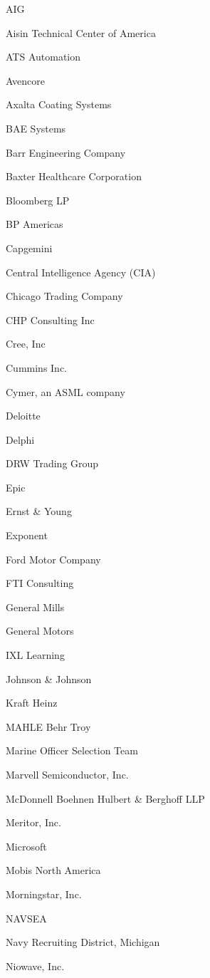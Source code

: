 \documentclass[twoside]{article}
\begin{document}
\begin{center}
\begin{multicols}{5}
\begin{FlushLeft}
\begin{compactitem}
        \item AIG
\item Aisin Technical Center of America
\item ATS Automation
\item Avencore
\item Axalta Coating Systems
\item BAE Systems
\item Barr Engineering Company
\item Baxter Healthcare Corporation
\item Bloomberg LP
\item BP Americas
\item Capgemini
\item Central Intelligence Agency (CIA)
\item Chicago Trading Company
\item CHP Consulting Inc
\item Cree, Inc
\item Cummins Inc.
\item Cymer, an ASML company
\item Deloitte
\item Delphi
\item DRW Trading Group
\item Epic
\item Ernst \& Young
\item Exponent
\item Ford Motor Company
\item FTI Consulting
\item General Mills
\item General Motors
\item IXL Learning
\item Johnson \& Johnson
\item Kraft Heinz
\item MAHLE Behr Troy
\item Marine Officer Selection Team
\item Marvell Semiconductor, Inc.
\item McDonnell Boehnen Hulbert \& Berghoff LLP
\item Meritor, Inc.
\item Microsoft
\item Mobis North America
\item Morningstar, Inc.
\item NAVSEA
\item Navy Recruiting District, Michigan
\item Niowave, Inc.

\end{compactitem}
\end{FlushLeft}
\end{multicols}
\end{center}
\end{document}
